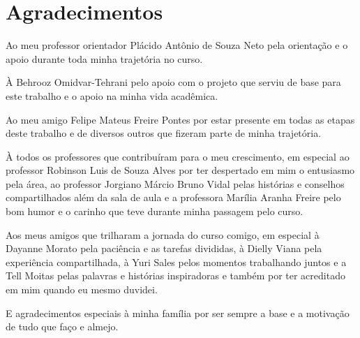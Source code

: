 
\chapter*{Agradecimentos}

Ao meu professor orientador Plácido Antônio de Souza Neto pela orientação e o apoio durante toda minha trajetória no curso.

À Behrooz Omidvar-Tehrani pelo apoio com o projeto que serviu de base para este trabalho e o apoio na minha vida acadêmica.

Ao meu amigo Felipe Mateus Freire Pontes por estar presente em todas as etapas deste trabalho e de diversos outros que fizeram parte de minha trajetória.

À todos os professores que contribuíram para o meu crescimento, em especial ao professor Robinson Luis de Souza Alves por ter despertado em mim o entusiasmo pela área, ao professor Jorgiano Márcio Bruno Vidal pelas histórias e conselhos compartilhados além da sala de aula e a professora Marília Aranha Freire pelo bom humor e o carinho que teve durante minha passagem pelo curso.

Aos meus amigos que trilharam a jornada do curso comigo, em especial à Dayanne Morato pela paciência e as tarefas divididas, à Dielly Viana pela experiência compartilhada, à Yuri Sales pelos momentos trabalhando juntos e a Tell Moitas pelas palavras e histórias inspiradoras e também por ter acreditado em mim quando eu mesmo duvidei.

E agradecimentos especiais à minha família por ser sempre a base e a motivação de tudo que faço e almejo.
